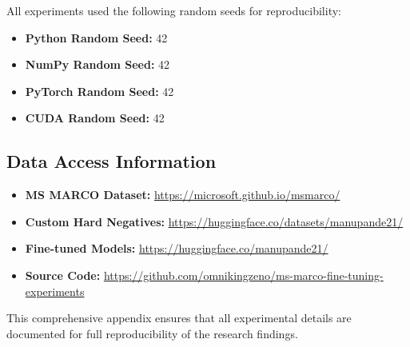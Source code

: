 All experiments used the following random seeds for reproducibility:

\begin{itemize}
\item \textbf{Python Random Seed:} 42
\item \textbf{NumPy Random Seed:} 42
\item \textbf{PyTorch Random Seed:} 42
\item \textbf{CUDA Random Seed:} 42
\end{itemize}

\subsection{Data Access Information}

\begin{itemize}
\item \textbf{MS MARCO Dataset:} \url{https://microsoft.github.io/msmarco/}
\item \textbf{Custom Hard Negatives:} \url{https://huggingface.co/datasets/manupande21/}
\item \textbf{Fine-tuned Models:} \url{https://huggingface.co/manupande21/}
\item \textbf{Source Code:} \url{https://github.com/omnikingzeno/ms-marco-fine-tuning-experiments}
\end{itemize}

This comprehensive appendix ensures that all experimental details are documented for full reproducibility of the research findings.
